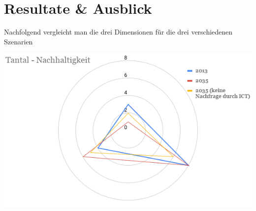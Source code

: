 \section{Resultate \& Ausblick}\label{sec:conflict}

Nachfolgend vergleicht man die drei Dimensionen für die drei verschiedenen Szenarien

\begin{center}
\includegraphics[width=17cm]{images/tantal-results}
\end{center}
